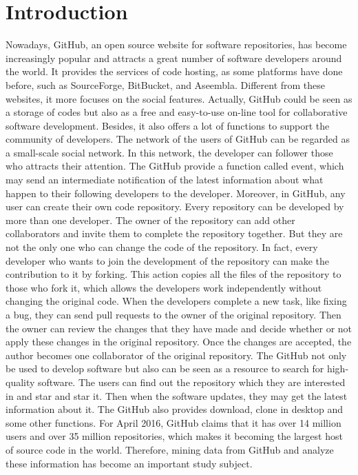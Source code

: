 \documentclass[12pt,oneside,final]{vlsithesis}
\begin{document}
\chapter{Introduction}
\setcounter{page}{1}
Nowadays, GitHub\cite{1}, an open source website for software repositories, has become increasingly popular and attracts a great number of software developers around the world. It provides the services of code hosting, as some platforms have done before, such as SourceForge, BitBucket, and Aseembla. Different from these websites, it more focuses on the social features. Actually, GitHub could be seen as a storage of codes but also as a free and easy-to-use on-line tool for collaborative software development. Besides, it also offers a lot of functions to support the community of developers. The network of the users of GitHub can be regarded as a small-scale social network. In this network, the developer can follower those who attracts their attention. The GitHub provide a function called event, which may send an intermediate notification of the latest information about what happen to their following developers to the developer. Moreover, in GitHub, any user can create their own code repository. Every repository can be developed by more than one developer. The owner of the repository can add other collaborators and invite them to complete the repository together. But they are not the only one who can change the code of the repository. In fact, every developer who wants to join the development of the repository can make the contribution to it by forking. This action copies all the files of the repository to those who fork it, which allows the developers work independently without changing the original code. When the developers complete a new task, like fixing a bug, they can send pull requests to the owner of the original repository. Then the owner can review the changes that they have made and decide whether or not apply these changes in the original repository. Once the changes are accepted, the author becomes one collaborator of the original repository. The GitHub not only be used to develop software but also can be seen as a resource to search for high-quality software. The users can find out the repository which they are interested in and star and star it. Then when the software updates, they may get the latest information about it. The GitHub also provides download, clone in desktop and some other functions. For April 2016, GitHub claims that it has over 14 million users and over 35 million repositories, which makes it becoming the largest host of source code in the world. Therefore, mining data from GitHub and analyze these information has become an important study subject. 
\end{document}
